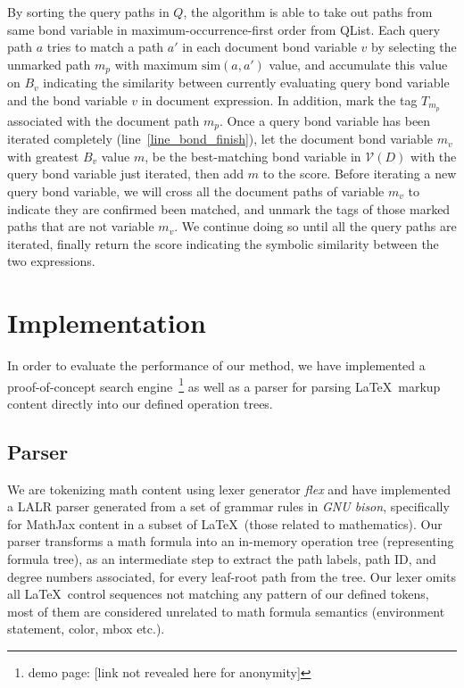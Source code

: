 \documentclass{acm_proc_article-sp}
\begin{document}
By sorting the query paths in $Q$, the algorithm is able to take out paths from same bond variable in maximum-occurrence-first order from QList. 
Each query path $a$ tries to match a path $a'$ in each document bond variable $v$ by selecting the unmarked path $m_p$ with maximum $\mathrm{sim}(a,a')$ value, and accumulate this value on $B_v$ indicating the similarity between currently evaluating query bond variable and the bond variable $v$ in document expression.
In addition, mark the tag $T_{m_p}$ associated with the document path $m_p$.
Once a query bond variable has been iterated completely (line~\ref{line_bond_finish}),
let the document bond variable $m_v$ with greatest $B_v$ value $m$, be the best-matching bond variable in $\mathcal{V}(D)$ with the query bond variable just iterated, then add $m$ to the score.
Before iterating a new query bond variable, we will cross all the document paths of variable $m_v$ to indicate they are confirmed been matched, 
and unmark the tags of those marked paths that are not variable $m_v$.
We continue doing so until all the query paths are iterated, finally return the score indicating the symbolic similarity between the two expressions.

\section{Implementation}
In order to evaluate the performance of our method, we have implemented a proof-of-concept search engine~\footnote{demo page: [link not revealed here for anonymity]} as well as a parser for parsing \LaTeX\ markup content directly into our defined operation trees.

\subsection{Parser}
We are tokenizing math content using lexer generator \textit{flex} and have implemented a LALR parser generated from a set of grammar rules in \textit{GNU bison}, specifically for MathJax content in a subset of \LaTeX\ (those related to mathematics).
Our parser transforms a math formula into an in-memory operation tree (representing formula tree), as an intermediate step to extract the path labels, path ID, and degree numbers associated, for every leaf-root path from the tree. 
Our lexer omits all \LaTeX\ control sequences not matching any pattern of our defined tokens, most of them are considered unrelated to math formula semantics (environment statement, color, mbox etc.).
\end{document}

